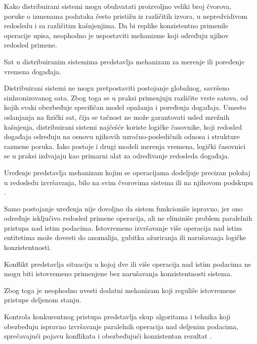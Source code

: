 Kako distribuirani sistemi mogu obuhvatati proizvoljno veliki broj čvorova, poruke o izmenama podataka često pristižu iz različitih izvora, u nepredvidivom redosledu i sa različitim kašnjenjima. Da bi replike konzistentno primenile operacije upisa, neophodno je uspostaviti mehanizme koji određuju njihov redosled primene.

\begin{definicija}
Sat u distribuiranim sistemima predstavlja mehanizam za merenje ili poređenje vremena događaja.
\end{definicija}

Distribuirani sistemi ne mogu pretpostaviti postojanje globalnog, savršeno sinhronizovanog sata. Zbog toga se u praksi primenjuju različite vrste satova, od kojih svaki obezbeđuje specifičan model opažanja i poređenja događaja. Umesto oslanjanja na fizički sat, čija se tačnost ne može garantovati usled mrežnih kašnjenja, distribuirani sistemi najčešće koriste logičke časovnike, koji redosled događaja određuju na osnovu njihovih uzročno-posledičnih odnosa i strukture razmene poruka. Iako postoje i drugi modeli merenja vremena, logički časovnici se u praksi izdvajaju kao primarni alat za određivanje redosleda događaja.

\begin{definicija}
Uređenje  predstavlja mehanizam kojim se operacijama dodeljuje precizan položaj u redosledu izvršavanja, bilo na svim čvorovima sistema ili na njihovom podskupu \cite{lamport2019time}.
\end{definicija}

Samo postojanje uređenja nije dovoljno da sistem funkcioniše ispravno, jer ono određuje isključivo redosled primene operacija, ali ne eliminiše problem paralelnih pristupa nad istim podacima. Istovremeno izvršavanje više operacija nad istim entitetima može dovesti do anomalija, gubitka ažuriranja ili narušavanja logičke konzistentnosti.

\begin{definicija}
Konflikt predstavlja situaciju u kojoj dve ili više operacija nad istim podacima ne mogu biti istovremeno primenjene bez narušavanja konzistentnosti sistema.
\end{definicija}

Zbog toga je neophodno uvesti dodatni mehanizam koji reguliše istovremene pristupe deljenom stanju.

\begin{definicija}
Kontrola konkurentnog pristupa  predstavlja skup algoritama i tehnika koji obezbeđuju ispravno izvršavanje paralelnih operacija nad deljenim podacima, sprečavajući pojavu konflikata i obezbeđujući konzistentan rezultat \cite{bernstein1987concurrency}.
\end{definicija}

